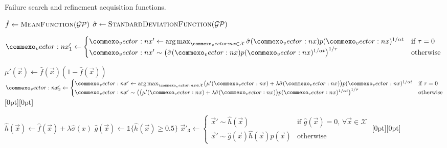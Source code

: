 {\centering
\begin{minipage}{\linewidth}\hypertarget{link:fsar}{}
    \linespread{1.0}\selectfont
    \begin{algorithm}[H]
        \caption{Failure search and refinement acquisition functions.} 
        \label{alg:fsar}
        \begin{algorithmic}[1]
        \State $\hat{f} \leftarrow \textproc{MeanFunction}(\mathcal{GP})$
        \State $\hat{\sigma} \leftarrow \textproc{StandardDeviationFunction}(\mathcal{GP})$
    
        \State $\vec{x}'_1 \leftarrow \begin{cases}
            \vec{x}' \leftarrow \argmax_{\vec{x} \in \mathcal{X}} \hat{\sigma}(\vec{x})p(\vec{x})^{1/\alpha t} & \text{if } \tau = 0\\
            \vec{x}' \sim \big( \hat{\sigma}(\vec{x})p(\vec{x})^{1/\alpha t} \big)^{1/\tau} & \text{otherwise}
        \end{cases}$ 

        \State $\mu'(\vec{x}) \leftarrow \hat{f}(\vec{x})(1 - \hat{f}(\vec{x}))$
        \State $\vec{x}'_2 \leftarrow \begin{cases}
            \vec{x}' \leftarrow \argmax_{\vec{x} \in \mathcal{X}} \bigl(\mu'(\vec{x}) + \lambda\hat{\sigma}(\vec{x})\bigr)p(\vec{x})^{1/\alpha t} & \text{if } \tau = 0\\
            \vec{x}' \sim \big( \bigl(\mu'(\vec{x}) + \lambda\hat{\sigma}(\vec{x})\bigr)p(\vec{x})^{1/\alpha t} \big)^{1/\tau} & \text{otherwise}
        \end{cases}$
        \raisebox{.5\baselineskip}[0pt][0pt]{}
    
        \State $\hat{h}(\vec{x}) \leftarrow \hat{f}(\vec{x}) + \lambda\hat{\sigma}(x)$
        \State $\hat{g}(\vec{x}) \leftarrow \mathds{1}\bigl\{\hat{h}(\vec{x}) \ge 0.5\bigr\}$
        \State $\vec{x}'_3 \leftarrow \begin{cases}
            \vec{x}' \sim \hat{h}(\vec{x}) & \text{if } \hat{g}(\vec{x}) = 0,\, \forall \vec{x} \in \mathcal{X} \\
            \vec{x}' \sim \hat{g}(\vec{x})\hat{h}(\vec{x})p(\vec{x}) & \text{otherwise}
        \end{cases}$
        \raisebox{1.2\baselineskip}[0pt][0pt]{}


\end{algorithmic}
\end{algorithm}
\end{minipage}}
